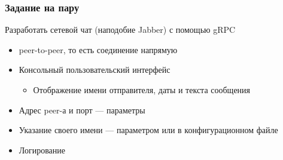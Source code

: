 \documentclass[xetex,mathserif,serif]{beamer}
\begin{document}
	\begin{frame}
		\frametitle{Задание на пару}
		Разработать сетевой чат (наподобие Jabber) с помощью gRPC
		\begin{itemize}
			\item peer-to-peer, то есть соединение напрямую
			\item Консольный пользовательский интерфейс
			\begin{itemize}
				\item Отображение имени отправителя, даты и текста сообщения
			\end{itemize}
			\item Адрес peer-а и порт --- параметры
			\item Указание своего имени --- параметром или в конфигурационном файле
			\item Логирование
		\end{itemize}
	\end{frame}
\end{document}
